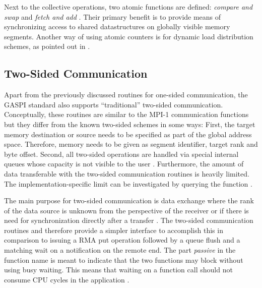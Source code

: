 Next to the collective operations, two atomic functions are defined: \emph{compare and swap} and \emph{fetch and add} \cite[ch.~10]{gaspi-std}. Their primary benefit is to provide means of synchronizing access to shared datastructures on globally visible memory segments. Another way of using atomic counters is for dynamic load distribution schemes, as pointed out in \cite[ch.~6]{gaspi-sum}.

\subsection{Two-Sided Communication}
\label{ssec:background:gaspi:two-sided}

Apart from the previously discussed routines for one-sided communication, the \ac{GASPI} standard also supports  \enquote{traditional} two-sided communication. Conceptually, these routines are similar to the \ac{MPI}-1 communication functions but they differ from the known two-sided schemes in some ways: First, the target memory destination or source needs to be specified as part of the global address space. Therefore, memory needs to be given as segment identifier, target rank and byte offset. Second, all two-sided operations are handled via special internal queues whose capacity is not visible to the user \cite[ch.~9.2]{gaspi-std}. Furthermore, the amount of data transferable with the two-sided communication routines is heavily limited. The implementation-specific limit can be investigated by querying the function  \cite[ch.~12.4.1]{gaspi-std}.

The main purpose for two-sided communication is data exchange where the rank of the data source is unknown from the perspective of the receiver or if there is need for synchronization directly after a transfer \cite[ch.~9.1]{gaspi-std}. The two-sided communication routines \gaspiPassiveSend and \gaspiPassiveReceive therefore provide a simpler interface to accomplish this in comparison to issuing a \ac{RMA} put operation followed by a queue flush and a matching wait on a notification on the remote end. The part \emph{passive} in the function name is meant to indicate that the two functions may block without using busy waiting. This means that waiting on a function call should not consume \ac{CPU} cycles in the application \cite[ch.~9.1]{gaspi-std}.


